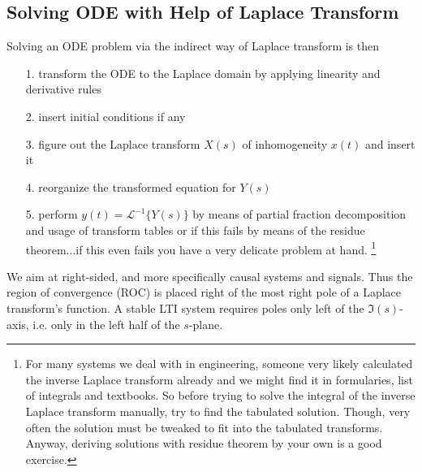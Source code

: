\documentclass[a4paper,11pt,oneside]{scrartcl}
\begin{document}
\subsection{Solving ODE with Help of Laplace Transform}

Solving an ODE problem via the indirect way of Laplace transform is then
\begin{itemize}
\item[1.] transform the ODE to the Laplace domain by applying linearity and
derivative rules
\item[2.] insert initial conditions if any
\item[3.] figure out the Laplace transform $X(s)$ of inhomogeneity $x(t)$ and insert
it
\item[4.] reorganize the transformed equation for $Y(s)$
\item[5.] perform $y(t) = \mathcal{L}^{-1}\{Y(s)\}$ by means of partial fraction
decomposition and usage of transform tables or if this fails by means of the
residue theorem...if this even fails you have a very delicate problem at hand.
\footnote{For many systems we deal with in engineering,
someone very likely calculated the inverse Laplace transform already and we
might find it in formularies, list of integrals and textbooks.
So before trying to solve the integral of the inverse Laplace transform
manually, try to find the tabulated solution.
Though, very often the solution must be tweaked to fit into the tabulated
transforms.
Anyway, deriving solutions with residue theorem by your own is a
good exercise.}
\end{itemize}

We aim at right-sided, and more specifically causal systems and signals.
Thus the region of convergence (ROC) is placed right of the most right pole of a
Laplace transform's function.
%
A stable LTI system requires poles only left of the $\Im(s)$-axis, i.e. only in
the left half of the $s$-plane.

\end{document}

